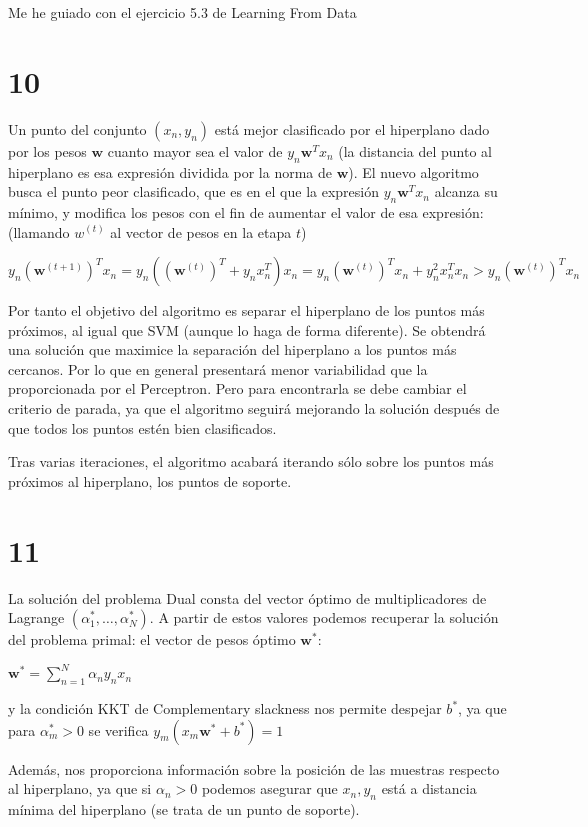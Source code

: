 \documentclass{article}
\begin{document}
Me he guiado con el ejercicio 5.3 de Learning From Data

\section{10}

Un punto del conjunto \((x_n,y_n)\) está mejor clasificado por el
hiperplano dado por los pesos \(\textbf{w}\) cuanto mayor sea el valor
de \(y_n\textbf{w}^Tx_n\) (la distancia del punto al hiperplano es esa
expresión dividida por la norma de \(\textbf{w}\)). El nuevo algoritmo
busca el punto peor clasificado, que es en el que la expresión
\(y_n\textbf{w}^Tx_n\) alcanza su mínimo, y modifica los pesos con el
fin de aumentar el valor de esa expresión: (llamando \(w^{(t)}\) al
vector de pesos en la etapa \(t\))

\(y_n(\textbf{w}^{(t+1)})^Tx_n=y_n((\textbf{w}^{(t)})^T+y_nx_n^T)x_n=y_n(\textbf{w}^{(t)})^Tx_n + y_n^2x_n^Tx_n>y_n(\textbf{w}^{(t)})^Tx_n\)

Por tanto el objetivo del algoritmo es separar el hiperplano de los
puntos más próximos, al igual que SVM (aunque lo haga de forma
diferente). Se obtendrá una solución que maximice la separación del
hiperplano a los puntos más cercanos. Por lo que en general presentará
menor variabilidad que la proporcionada por el Perceptron. Pero para
encontrarla se debe cambiar el criterio de parada, ya que el algoritmo
seguirá mejorando la solución después de que todos los puntos estén
bien clasificados.

Tras varias iteraciones, el algoritmo acabará iterando sólo sobre los
puntos más próximos al hiperplano, los puntos de soporte.

\section{11}

La solución del problema Dual consta del vector óptimo de
multiplicadores de Lagrange \((\alpha_1^*,\ldots,\alpha_N^*)\). A
partir de estos valores podemos recuperar la solución del problema
primal: el vector de pesos óptimo \(\textbf{w}^*\):

\(\textbf{w}^*=\sum\limits_{n=1}^{N}\alpha_ny_nx_n\)

y la condición KKT de Complementary slackness nos permite despejar
\(b^*\), ya que para \(\alpha_m^*>0\) se verifica
\(y_m(x_m\textbf{w}^*+b^*)=1\)

Además, nos proporciona información sobre la posición de las muestras
respecto al hiperplano, ya que si \(\alpha_n>0\) podemos asegurar que
\(x_n,y_n\) está a distancia mínima del hiperplano (se trata de un
punto de soporte).
\end{document}
